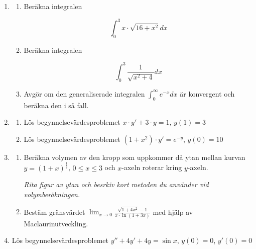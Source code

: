 \documentclass[11pt]{article}
\begin{document}
\begin{enumerate}
    \item
        \begin{enumerate}
            \item Beräkna integralen

            \[
                \int_0^3 x \cdot \sqrt{16 + x^2} dx
            \]

            \item Beräkna integralen

            \[
                \int_0^3 \frac{1}{\sqrt{x^2 + 4}} dx
            \]

            \item Avgör om den generaliserade integralen
                  $\displaystyle \int_0^\infty e^{-x} dx$ är konvergent och
                  beräkna den i så fall.

        \end{enumerate}

    \item
        \begin{enumerate}
            \item Lös begynnelsevärdesproblemet $x \cdot y' + 3 \cdot y = 1$,
                  $y(1) = 3$

            \item Lös begynnelsevärdesproblemet $(1 + x^2) \cdot y' = e^{-y}$,
                  $y(0) = 10$
        \end{enumerate}

    \item
        \begin{enumerate}
            \item Beräkna volymen av den kropp som uppkommer då ytan mellan
                  kurvan $y = (1 + x)^{\frac{1}{4}}$, $0 \leq x \leq 3$ och
                  $x$-axeln roterar kring $y$-axeln.

                  \textit{Rita figur av ytan och besrkiv kort metoden du
                          använder vid volymberäkningen.}

            \item Bestäm gränsvärdet
                $\displaystyle \lim_{x \to 0}\frac{\sqrt{1 + 4x^2} - 1}{x \cdot \ln(1 + 3x)}$
                med hjälp av Maclaurinutveckling.
        \end{enumerate}

    \item Lös begynnelsevärdesproblemet $y'' + 4y' + 4y = \sin x$, $y(0) = 0$, $y'(0) = 0$


\end{enumerate}
\end{document}
